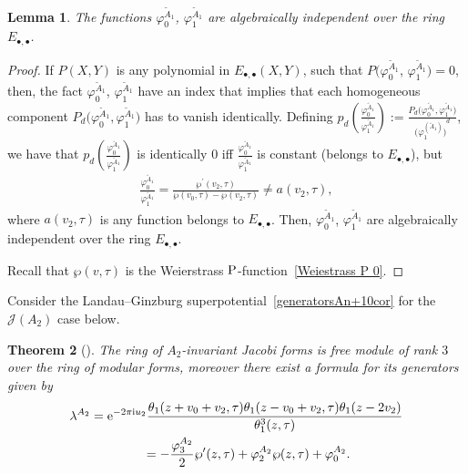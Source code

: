 \documentclass[10pt,a4paper]{amsart}
\numberwithin{equation}{section}
\newtheorem{Theorem}{Theorem}[section]
\newtheorem{Lemma}[Theorem]{Lemma}
\newcommand{\Ja}{\mathcal{J}}
\begin{document}
\begin{Lemma}The functions $\varphi_0^{\tilde A_1}$, $\varphi_1^{\tilde A_1}$ are algebraically independent over the ring $E_{\bullet,\bullet}$.
\end{Lemma}
\begin{proof}
If $P(X,Y)$ is any polynomial in $E_{\bullet,\bullet}(X,Y)$, such that $P\big(\varphi_0^{\tilde A_1}$, $\varphi_1^{\tilde A_1}\big)=0$, then, the fact $\varphi_0^{\tilde A_1}$, $\varphi_1^{\tilde A_1}$ have an index that implies that each homogeneous component $P_d\big(\varphi_0^{\tilde A_1}, \varphi_1^{\tilde A_1}\big)$ has to vanish identically. Defining $p_d\left(\frac{\varphi_0^{\tilde A_1}}{\varphi_1^{\tilde A_1}}\right):=\frac{P_d\big(\varphi_0^{\tilde A_1}, \varphi_1^{\tilde A_1}\big)}{{\big(\varphi_1^{\left(\tilde A_1\right)}\big)}^d}$, we have that $p_d\left(\frac{\varphi_0^{\tilde A_1}}{\varphi_1^{\tilde A_1}}\right)$ is identically $0$ iff $\frac{\varphi_0^{\tilde A_1}}{\varphi_1^{\tilde A_1}}$ is constant (belongs to $E_{\bullet,\bullet}$), but
\begin{gather*}
\frac{\varphi_0^{\tilde A_1}}{\varphi_1^{\tilde A_1}}=\frac{\wp^{\prime}(v_2,\tau)}{\wp(v_0,\tau)-\wp(v_2,\tau)}\neq a(v_2,\tau),
\end{gather*}
where $a(v_2,\tau)$ is any function belongs to $E_{\bullet,\bullet}$.
Then, $\varphi_0^{\tilde A_1}$, $\varphi_1^{\tilde A_1}$ are algebraically independent over the ring $E_{\bullet,\bullet}$.

Recall that $\wp(v,\tau)$ is the Weierstrass $\rm P$-function~\eqref{Weiestrass P 0}.
\end{proof}

Consider the Landau--Ginzburg superpotential~\eqref{generatorsAn+10cor} for the $\Ja(A_2)$ case below.

\begin{Theorem}[\cite{BertolaM.1}]
The ring of $A_{2}$-invariant Jacobi forms is free module of rank $3$ over the ring of modular forms, moreover there exist a formula for its generators given by
\begin{gather}
\lambda^{A_{2}}={\rm e}^{-2\pi {\rm i} u_2}\frac{ \theta_1(z+v_0+v_{2},\tau)\theta_1(z-v_0+v_{2},\tau) \theta_1(z-2v_{2})}{\theta_1^{3}(z,\tau)}\nonumber
\\ \hphantom{\lambda^{A_{2}}}
=-\frac{\varphi_{3}^{A_{2}}}{2}\wp^{\prime}(z,\tau)+\varphi_{2}^{A_{2}}\wp(z,\tau)+\varphi_{0}^{A_{2}}.
\label{generatorsAn+10cor}
\end{gather}
\end{Theorem}
\end{document}

